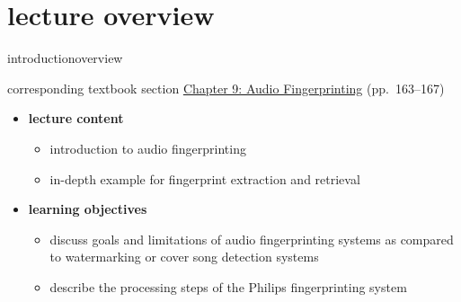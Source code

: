 




\subtitle{Module 9.0: Audio Fingerprinting}


	

    \section[overview]{lecture overview}
        \begin{frame}{introduction}{overview}
            \begin{block}{corresponding textbook section}
                    \href{http://ieeexplore.ieee.org/xpl/articleDetails.jsp?arnumber=6331126}{Chapter 9: Audio Fingerprinting} (pp.~163--167)
            \end{block}

            \begin{itemize}
                \item   \textbf{lecture content}
                    \begin{itemize}
                        \item   introduction to audio fingerprinting
                        \item   in-depth example for fingerprint extraction and retrieval
                    \end{itemize}
                \bigskip
                \item<2->   \textbf{learning objectives}
                    \begin{itemize}
                        \item   discuss goals and limitations of audio fingerprinting systems as compared to watermarking or cover song detection systems
                        \item   describe the processing steps of the Philips fingerprinting system
                    \end{itemize}
            \end{itemize}
        \end{frame}

